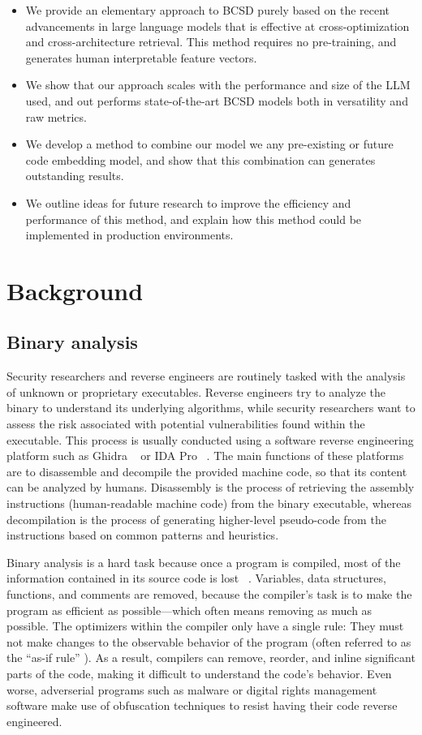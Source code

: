 \begin{itemize}
\item We provide an elementary approach to BCSD purely based on the recent advancements in large language models that
    is effective at cross-optimization and cross-architecture retrieval. This method requires no pre-training, and
    generates human interpretable feature vectors.
\item We show that our approach scales with the performance and size of the LLM used, and out performs state-of-the-art BCSD models
    both in versatility and raw metrics.
\item We develop a method to combine our model we any pre-existing or future code embedding model, and show that this combination can
    generates outstanding results.
\item We outline ideas for future research to improve the efficiency and performance of this method, and explain how this method
    could be implemented in production environments.
\end{itemize}

\section{Background}

\subsection{Binary analysis}

Security researchers and reverse engineers are routinely tasked with the analysis of unknown or proprietary executables.
Reverse engineers try to analyze the binary to understand its underlying algorithms, while security researchers want to assess
the risk associated with potential vulnerabilities found within the executable. This process is usually conducted using
a software reverse engineering platform such as Ghidra ~\cite{ghidra} or IDA Pro ~\cite{ida}. The main functions of these platforms are to
disassemble and decompile the provided machine code, so that its content can be analyzed by humans. Disassembly is
the process of retrieving the assembly instructions (human-readable machine code) from the binary executable, whereas decompilation
is the process of generating higher-level pseudo-code from the instructions based on common patterns and heuristics.

Binary analysis is a hard task because once a program is compiled, most of the information contained in its source code
is lost ~\cite{BCSDsurvey}. Variables, data structures, functions, and comments are removed, because the compiler's task is to make
the program as efficient as possible---which often means removing as much as possible. The optimizers within the compiler
only have a single rule: They must not make changes to the observable behavior of the program (often referred
to as the ``as-if rule'' \cite{c++11}). As a result, compilers can remove, reorder, and inline significant parts of the code, making
it difficult to understand the code's behavior. Even worse, adverserial programs such as malware or digital rights management software
make use of obfuscation techniques to resist having their code reverse engineered.


